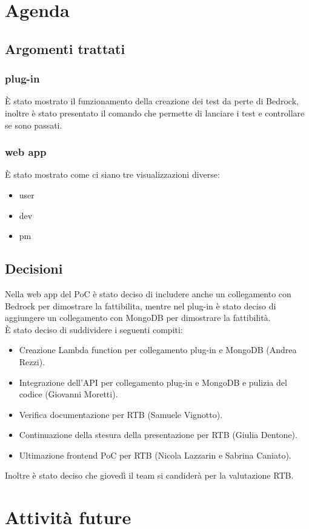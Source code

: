 \documentclass{article}
\begin{document}
\section{Agenda}
\subsection{Argomenti trattati}
\subsubsection{plug-in}
È stato mostrato il funzionamento della creazione dei test da perte di Bedrock, inoltre è stato presentato il comando che permette di lanciare i test e controllare se sono passati.
\subsubsection{web app}
È stato mostrato come ci siano tre visualizzazioni diverse:\begin{itemize}
    \item user
    \item dev
    \item pm
\end{itemize}
\subsection{Decisioni}
Nella web app del PoC è stato deciso di includere anche un collegamento con Bedrock per dimostrare la fattibilita, mentre nel plug-in è stato deciso di aggiungere un collegamento con MongoDB per dimostrare la fattibilità.\\
È stato deciso di suddividere i seguenti compiti:\begin{itemize}
    \item Creazione Lambda function per collegamento plug-in e MongoDB (Andrea Rezzi).
    \item Integrazione dell'API per collegamento plug-in e MongoDB e pulizia del codice (Giovanni Moretti).
    \item Verifica documentazione per RTB (Samuele Vignotto).
    \item Continuazione della stesura della presentazione per RTB (Giulia Dentone).
    \item Ultimazione frontend PoC per RTB (Nicola Lazzarin e Sabrina Caniato).
\end{itemize}
Inoltre è stato deciso che giovedì il team si candiderà per la valutazione RTB.
\section{Attività future}
\end{document}
